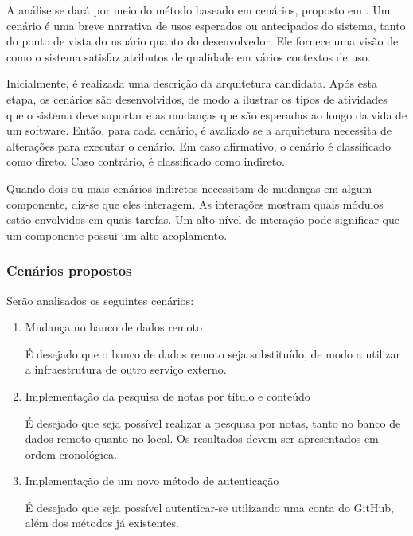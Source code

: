 A análise se dará por meio do método baseado em cenários, proposto em \cite{scenario-based}.
Um cenário é uma breve narrativa de usos esperados ou antecipados do sistema, tanto do ponto de vista do usuário quanto do desenvolvedor.
Ele fornece uma visão de como o sistema satisfaz atributos de qualidade em vários contextos de uso.

Inicialmente, é realizada uma descrição da arquitetura candidata.
Após esta etapa, os cenários são desenvolvidos, de modo a ilustrar os tipos de atividades que o sistema deve suportar e as mudanças que são esperadas ao longo da vida de um software.
Então, para cada cenário, é avaliado se a arquitetura necessita de alterações para executar o cenário.
Em caso afirmativo, o cenário é classificado como direto. Caso contrário, é classificado como indireto.

Quando dois ou mais cenários indiretos necessitam de mudanças em algum componente, diz-se que eles interagem.
As interações mostram quais módulos estão envolvidos em quais tarefas.
Um alto nível de interação pode significar que um componente possui um alto acoplamento.

\subsubsection{Cenários propostos}

Serão analisados os seguintes cenários:

\begin{enumerate}
	\item Mudança no banco de dados remoto

	      É desejado que o banco de dados remoto seja substituído, de modo a utilizar a infraestrutura de outro serviço externo.

	\item Implementação da pesquisa de notas por título e conteúdo

	      É desejado que seja possível realizar a pesquisa por notas, tanto no banco de dados remoto quanto no local. Os resultados devem ser apresentados em ordem cronológica.

	\item Implementação de um novo método de autenticação

	      É desejado que seja possível autenticar-se utilizando uma conta do GitHub, além dos métodos já existentes.
\end{enumerate}